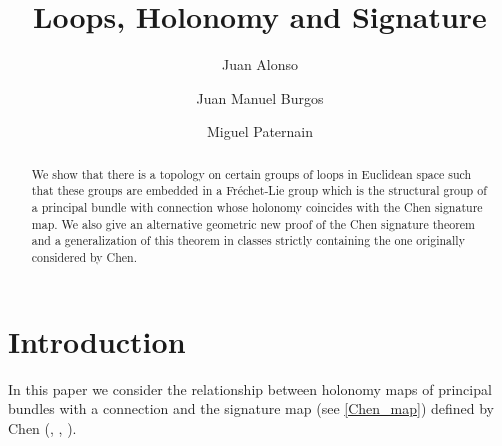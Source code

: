 \documentclass{amsart}
\begin{document}
\title[Loops, Holonomy and Signature]{Loops, Holonomy and Signature}


\author{Juan Alonso}
\address{Universidad de la Rep\'ublica, Centro de Matem\'atica,  Facultad de Ciencias, Igu\'a 4225, 11400 Montevideo
\\Uruguay.}


\author{Juan Manuel Burgos}
\address{Instituto de Matemática y Estadística, FING, UDELAR, Av. Julio Herrera y Reissig 565, CP 11300, Montevideo, Uruguay\\ Unidad Académica Matemática, FCEA, UDELAR, Gonzalo Ramírez 1926, CP 11200, Montevideo, Uruguay.}

\author{Miguel Paternain}
\address{Universidad de la Rep\'ublica, Centro de Matem\'atica,  Facultad de Ciencias, Igu\'a 4225, 11400 Montevideo
\\Uruguay.}




\begin{abstract}
We show that there is a topology on certain groups of loops in Euclidean space such that these groups are embedded in a Fréchet-Lie group which is the structural group of a principal bundle with connection whose holonomy coincides with the Chen signature map. We also give an alternative geometric new proof of the Chen signature theorem and a generalization of this theorem in classes strictly containing the one originally considered by Chen.
\end{abstract}



\maketitle

\section{Introduction}

In this paper we consider the  relationship between holonomy maps of principal bundles with a connection and the signature map (see \eqref{Chen_map}) defined by Chen (\cite{Chen1},  \cite{Chen2prima}, \cite{Chen2}).
\end{document}
